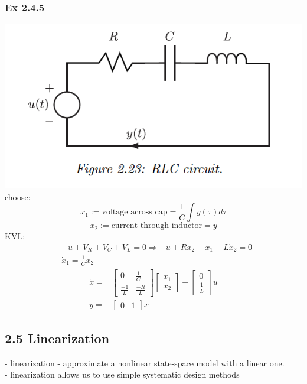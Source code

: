 \documentclass[letterpaper]{article}
\begin{document}
\subsubsection*{Ex 2.4.5}
\includegraphics[scale=0.9]{images/Ex2_4_5.png}\\
choose: $$x_1:=\text{voltage across cap}=\frac{1}{C}\int y(\tau)d\tau$$
$$x_2:=\text{current through inductor}=y$$
KVL:
\begin{align*}
	  & -u+V_R+V_C+V_L=0\Rightarrow-u+Rx_2+x_1+L\dot x_2=0 \\
	  & \dot x_1=\frac{1}{C}x_2                            
\end{align*}
\begin{align*}
	\dot x=&
	\begin{bmatrix}
	0&\frac{1}{C}\\
	\frac{-1}{L}&\frac{-R}{L}
	\end{bmatrix}
	\begin{bmatrix}
	x_1\\x_2
	\end{bmatrix}
	+\begin{bmatrix}
	0\\\frac{1}{L}
	\end{bmatrix}u\\
	y= & \begin{bmatrix} 0 & 1\end{bmatrix}x 
\end{align*}

\subsection*{2.5 Linearization}
- linearization - approximate a nonlinear state-space model with a linear one.\\
- linearization allows us to use simple systematic design methods\\
\end{document}
